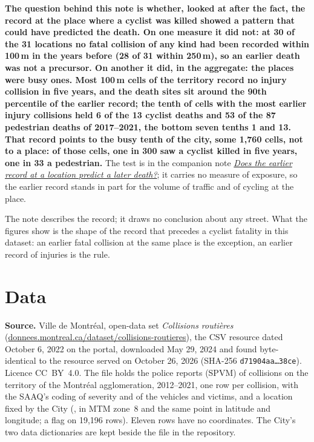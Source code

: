 \documentclass[11pt,letterpaper]{article}
\newcommand{\code}[1]{\texttt{\seqsplit{#1}}}
\newcommand{\repourl}{https://github.com/OpenMobilityData/Montreal-collisions}
\newcommand{\doc}[2]{\href{\repourl/blob/main/#1}{#2}}
\begin{document}
\textbf{The question behind this note is whether, looked at after the fact, the record at the place where a cyclist was killed showed a pattern that could have predicted the death. On one measure it did not: at 30 of the 31 locations no fatal collision of any kind had been recorded within 100\,m in the years before (28 of 31 within 250\,m), so an earlier death was not a precursor. On another it did, in the aggregate: the places were busy ones. Most 100\,m cells of the territory record no injury collision in five years, and the death sites sit around the 90th percentile of the earlier record; the tenth of cells with the most earlier injury collisions held 6 of the 13 cyclist deaths and 53 of the 87 pedestrian deaths of 2017--2021, the bottom seven tenths 1 and 13. That record points to the busy tenth of the city, some 1,760 cells, not to a place: of those cells, one in 300 saw a cyclist killed in five years, one in 33 a pedestrian.} The test is in the companion note \doc{derived/location-record-and-later-deaths/}{\emph{Does the earlier record at a location predict a later death?}}; it carries no measure of exposure, so the earlier record stands in part for the volume of traffic and of cycling at the place.

The note describes the record; it draws no conclusion about any street. What the figures show is the shape of the record that precedes a cyclist fatality in this dataset: an earlier fatal collision at the same place is the exception, an earlier record of injuries is the rule.

\section{Data}

\textbf{Source.} Ville de Montréal, open-data set \emph{Collisions routières} (\href{https://donnees.montreal.ca/dataset/collisions-routieres}{donnees.montreal.ca/dataset/collisions-routieres}), the CSV resource dated October 6, 2022 on the portal, downloaded May 29, 2024 and found byte-identical to the resource served on October 26, 2026 (SHA-256 \texttt{d71904aa…38ce}). Licence CC~BY~4.0. The file holds the police reports (SPVM) of collisions on the territory of the Montréal agglomeration, 2012--2021, one row per collision, with the SAAQ's coding of severity and of the vehicles and victims, and a location fixed by the City (\code{LOC\_X}, \code{LOC\_Y} in MTM zone~8 and the same point in latitude and longitude; a flag \code{LOC\_IMPRECISION} on 19,196 rows). Eleven rows have no coordinates. The City's two data dictionaries are kept beside the file in the repository.
\end{document}

